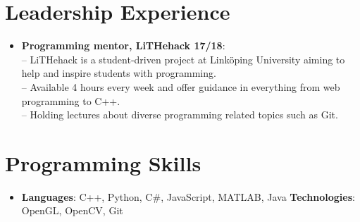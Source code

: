 \documentclass[letterpaper,11pt]{article}
\newcommand{\resumeItem}[2]{
  \item\small{
    \textbf{#1}{: #2 \vspace{-2pt}}
  }
}
\newcommand{\resumeSubItem}[2]{\resumeItem{#1}{#2}\vspace{-4pt}}
\newcommand{\resumeSubHeadingListStart}{\begin{itemize}[leftmargin=*]}
\newcommand{\resumeSubHeadingListEnd}{\end{itemize}}
\begin{document}
\section{Leadership Experience}
  \resumeSubHeadingListStart
    \resumeSubItem{Programming mentor, LiTHehack 17/18}
      {\\
      \indent-- LiTHehack is a student-driven project at Linköping University aiming to help and inspire students with programming. \\
      \indent-- Available 4 hours every week and offer guidance in everything from web programming to C++.\\
      \indent-- Holding lectures about diverse programming related topics such as Git.\\}
      
    \resumeSubHeadingListEnd
  
%
\section{Programming Skills}
  \resumeSubHeadingListStart
    \item{
      \textbf{Languages}{: C++, Python, C\#, JavaScript, MATLAB, Java}
      \hfill
      \textbf{Technologies}{: OpenGL, OpenCV, Git}
    }
  \resumeSubHeadingListEnd
\end{document}
